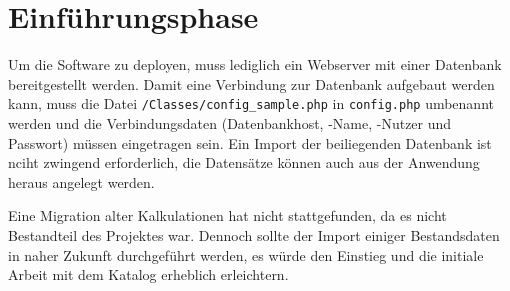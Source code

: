 \section{Einführungsphase}
\label{sec:Einfuehrungsphase}
Um die Software zu deployen, muss lediglich ein Webserver mit
einer Datenbank bereitgestellt werden. Damit eine Verbindung zur Datenbank
aufgebaut werden kann, muss die Datei \texttt{/Classes/config\_sample.php} in
\texttt{config.php} umbenannt werden und die Verbindungsdaten
(Datenbankhost, -Name, -Nutzer und Passwort) müssen eingetragen sein.
Ein Import der beiliegenden Datenbank ist nciht zwingend erforderlich, die
Datensätze können auch aus der Anwendung heraus angelegt werden.

Eine Migration alter Kalkulationen hat nicht stattgefunden, da es nicht
Bestandteil des Projektes war. Dennoch sollte der Import einiger Bestandsdaten
in naher Zukunft durchgeführt werden, es würde den Einstieg und die initiale
Arbeit mit dem Katalog erheblich erleichtern.
